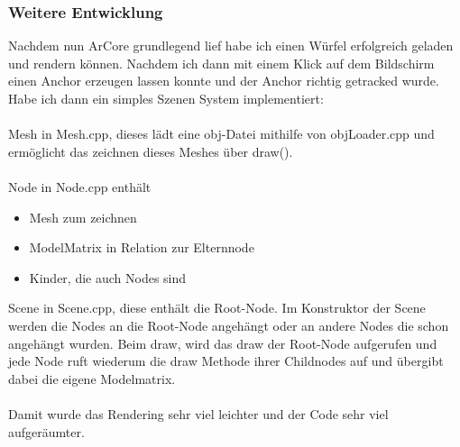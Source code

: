 \subsubsection{Weitere Entwicklung}
Nachdem nun ArCore grundlegend lief habe ich einen Würfel erfolgreich geladen und rendern können.
Nachdem ich dann mit einem Klick auf dem Bildschirm einen
Anchor erzeugen lassen konnte und der Anchor richtig getracked wurde.
Habe ich dann ein simples Szenen System implementiert:
\\ \\
Mesh in Mesh.cpp, dieses lädt eine obj-Datei mithilfe von objLoader.cpp und ermöglicht das zeichnen dieses Meshes über draw().
\\ \\
Node in Node.cpp enthält
\begin{itemize}
  \item Mesh zum zeichnen
  \item ModelMatrix in Relation zur Elternnode
  \item Kinder, die auch Nodes sind
\end{itemize}
Scene in Scene.cpp, diese enthält die Root-Node.
Im Konstruktor der Scene werden die Nodes an die Root-Node angehängt oder an andere Nodes die schon angehängt wurden. Beim draw, wird das draw der Root-Node aufgerufen und jede Node ruft wiederum
die draw Methode ihrer Childnodes auf und übergibt dabei die eigene Modelmatrix.
\\ \\
Damit wurde das Rendering sehr viel leichter und der Code sehr viel aufgeräumter.

